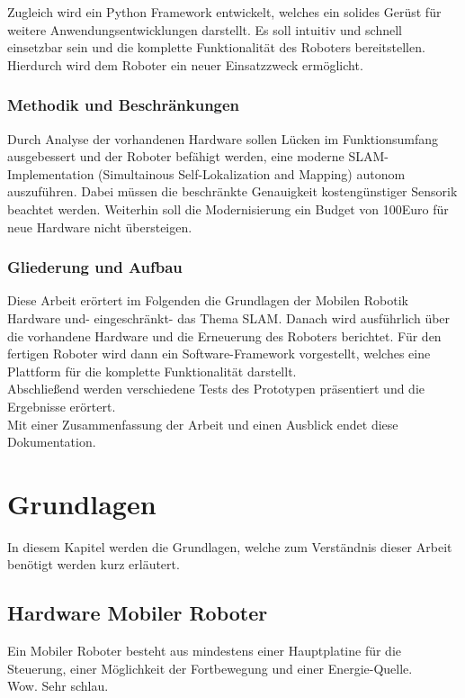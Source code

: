 \documentclass[twoside,12pt,a4paper]{report}
\begin{document}
	Zugleich wird ein Python Framework entwickelt, welches ein solides Gerüst für weitere Anwendungsentwicklungen darstellt. Es soll intuitiv und schnell einsetzbar sein und die komplette Funktionalität des Roboters bereitstellen. Hierdurch wird dem Roboter ein neuer Einsatzzweck ermöglicht. \\
	
	
	\subsection{Methodik und Beschränkungen}
	
	Durch Analyse der vorhandenen Hardware sollen Lücken im Funktionsumfang ausgebessert und der Roboter befähigt werden, eine moderne SLAM-Implementation (Simultainous Self-Lokalization and Mapping) autonom auszuführen. 
	Dabei müssen die beschränkte Genauigkeit kostengünstiger Sensorik beachtet werden. Weiterhin soll die Modernisierung ein Budget von 100Euro für neue Hardware nicht übersteigen. 
	
	\subsection{Gliederung und Aufbau}
	
	Diese Arbeit erörtert im Folgenden die Grundlagen der Mobilen Robotik Hardware und- eingeschränkt- das Thema SLAM. Danach wird ausführlich über die vorhandene Hardware und die Erneuerung des Roboters berichtet. Für den fertigen Roboter wird dann ein Software-Framework vorgestellt, welches eine Plattform für die komplette Funktionalität darstellt. \\
	Abschließend werden verschiedene  Tests des Prototypen präsentiert und die Ergebnisse erörtert. \\
	Mit einer Zusammenfassung der Arbeit und einen Ausblick endet diese Dokumentation.  
	
	
	
	
	
	\chapter{Grundlagen}
	In diesem Kapitel werden die Grundlagen, welche zum Verständnis dieser Arbeit benötigt werden kurz erläutert.
	
	\section{Hardware Mobiler Roboter}
	Ein Mobiler Roboter besteht aus mindestens einer Hauptplatine für die Steuerung, einer Möglichkeit der Fortbewegung und einer Energie-Quelle. \\
	Wow. Sehr schlau. \\
	
\end{document}
